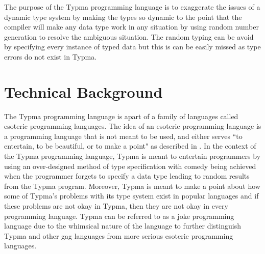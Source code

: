 \documentclass[10pt,twocolumn]{article}
\begin{document}
The purpose of the Typma programming language is to exaggerate the issues of a dynamic type system by making the types so dynamic to the point that the compiler will make any data type work in any situation by using random number generation to resolve the ambiguous situation. The random typing can be avoid by specifying every instance of typed data but this is can be easily missed as type errors do not exist in Typma.

\section{Technical Background}

The Typma programming language is apart of a family of languages called esoteric programming languages. The idea of an esoteric programming language is a programming language that is not meant to be used, and either serves ``to
entertain, to be beautiful, or to make a point" as described in \textcite{Morr2014Esoteric}. In the context of the Typma programming language, Typma is meant to entertain programmers by using an over-designed method of type specification with comedy being achieved when the programmer forgets to specify a data type leading to random results from the Typma program. Moreover, Typma is meant to make a point about how some of Typma's problems with its type system exist in popular languages and if these problems are not okay in Typma, then they are not okay in every programming language. Typma can be referred to as a joke programming language due to the whimsical nature of the language to further distinguish Typma and other gag languages from more serious esoteric programming languages.
\end{document}
